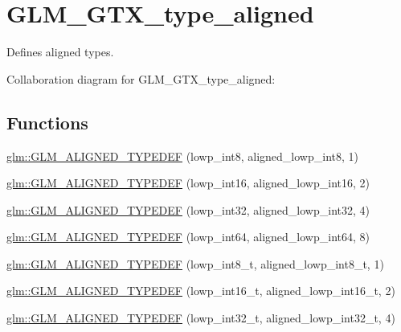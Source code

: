 \hypertarget{group__gtx__type__aligned}{\section{G\-L\-M\-\_\-\-G\-T\-X\-\_\-type\-\_\-aligned}
\label{group__gtx__type__aligned}
}


Defines aligned types.  


Collaboration diagram for G\-L\-M\-\_\-\-G\-T\-X\-\_\-type\-\_\-aligned\-:
\subsection*{Functions}
\begin{DoxyCompactItemize}
\item 
\hyperlink{group__gtx__type__aligned_gab5cd5c5fad228b25c782084f1cc30114}{glm\-::\-G\-L\-M\-\_\-\-A\-L\-I\-G\-N\-E\-D\-\_\-\-T\-Y\-P\-E\-D\-E\-F} (lowp\-\_\-int8, aligned\-\_\-lowp\-\_\-int8, 1)
\item 
\hyperlink{group__gtx__type__aligned_ga5bb5dd895ef625c1b113f2cf400186b0}{glm\-::\-G\-L\-M\-\_\-\-A\-L\-I\-G\-N\-E\-D\-\_\-\-T\-Y\-P\-E\-D\-E\-F} (lowp\-\_\-int16, aligned\-\_\-lowp\-\_\-int16, 2)
\item 
\hyperlink{group__gtx__type__aligned_gac6efa54cf7c6c86f7158922abdb1a430}{glm\-::\-G\-L\-M\-\_\-\-A\-L\-I\-G\-N\-E\-D\-\_\-\-T\-Y\-P\-E\-D\-E\-F} (lowp\-\_\-int32, aligned\-\_\-lowp\-\_\-int32, 4)
\item 
\hyperlink{group__gtx__type__aligned_ga6612eb77c8607048e7552279a11eeb5f}{glm\-::\-G\-L\-M\-\_\-\-A\-L\-I\-G\-N\-E\-D\-\_\-\-T\-Y\-P\-E\-D\-E\-F} (lowp\-\_\-int64, aligned\-\_\-lowp\-\_\-int64, 8)
\item 
\hyperlink{group__gtx__type__aligned_ga7ddc1848ff2223026db8968ce0c97497}{glm\-::\-G\-L\-M\-\_\-\-A\-L\-I\-G\-N\-E\-D\-\_\-\-T\-Y\-P\-E\-D\-E\-F} (lowp\-\_\-int8\-\_\-t, aligned\-\_\-lowp\-\_\-int8\-\_\-t, 1)
\item 
\hyperlink{group__gtx__type__aligned_ga22240dd9458b0f8c11fbcc4f48714f68}{glm\-::\-G\-L\-M\-\_\-\-A\-L\-I\-G\-N\-E\-D\-\_\-\-T\-Y\-P\-E\-D\-E\-F} (lowp\-\_\-int16\-\_\-t, aligned\-\_\-lowp\-\_\-int16\-\_\-t, 2)
\item 
\hyperlink{group__gtx__type__aligned_ga8130ea381d76a2cc34a93ccbb6cf487d}{glm\-::\-G\-L\-M\-\_\-\-A\-L\-I\-G\-N\-E\-D\-\_\-\-T\-Y\-P\-E\-D\-E\-F} (lowp\-\_\-int32\-\_\-t, aligned\-\_\-lowp\-\_\-int32\-\_\-t, 4)
\item 

\end{DoxyCompactItemize}
